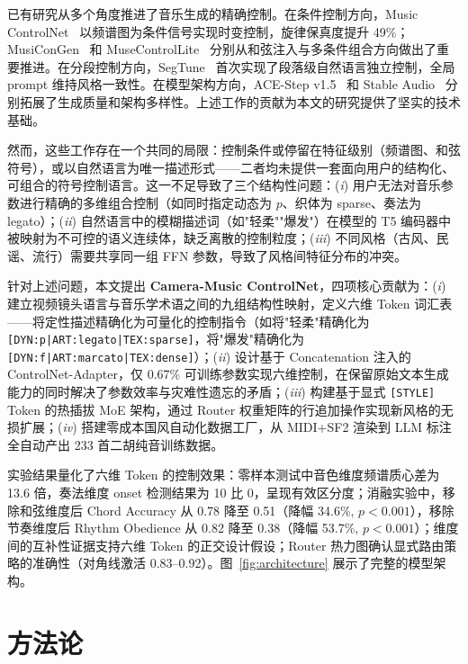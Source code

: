 \documentclass[11pt]{article}
\begin{document}
已有研究从多个角度推进了音乐生成的精确控制。在条件控制方向，Music ControlNet~\cite{musiccontrolnet} 以频谱图为条件信号实现时变控制，旋律保真度提升 49\%；MusiConGen~\cite{musecong} 和 MuseControlLite~\cite{muselite} 分别从和弦注入与多条件组合方向做出了重要推进。在分段控制方向，SegTune~\cite{segtune} 首次实现了段落级自然语言独立控制，全局 prompt 维持风格一致性。在模型架构方向，ACE-Step v1.5~\cite{acestep} 和 Stable Audio~\cite{stableaudio} 分别拓展了生成质量和架构多样性。上述工作的贡献为本文的研究提供了坚实的技术基础。

然而，这些工作存在一个共同的局限：控制条件或停留在特征级别（频谱图、和弦符号），或以自然语言为唯一描述形式——二者均未提供一套面向用户的结构化、可组合的符号控制语言。这一不足导致了三个结构性问题：(\textit{i}) 用户无法对音乐参数进行精确的多维组合控制（如同时指定动态为 $p$、织体为 sparse、奏法为 legato）；(\textit{ii}) 自然语言中的模糊描述词（如"轻柔""爆发"）在模型的 T5 编码器中被映射为不可控的语义连续体，缺乏离散的控制粒度；(\textit{iii}) 不同风格（古风、民谣、流行）需要共享同一组 FFN 参数，导致了风格间特征分布的冲突。

针对上述问题，本文提出 \textbf{Camera-Music ControlNet}，四项核心贡献为：(\textit{i}) 建立视频镜头语言与音乐学术语之间的九组结构性映射，定义六维 Token 词汇表——将定性描述精确化为可量化的控制指令（如将"轻柔"精确化为 \texttt{[DYN:p|ART:legato|TEX:sparse]}，将"爆发"精确化为 \texttt{[DYN:f|ART:marcato|TEX:dense]}）；(\textit{ii}) 设计基于 Concatenation 注入的 ControlNet-Adapter，仅 0.67\% 可训练参数实现六维控制，在保留原始文本生成能力的同时解决了参数效率与灾难性遗忘的矛盾；(\textit{iii}) 构建基于显式 \texttt{[STYLE]} Token 的热插拔 MoE 架构，通过 Router 权重矩阵的行追加操作实现新风格的无损扩展；(\textit{iv}) 搭建零成本国风自动化数据工厂，从 MIDI+SF2 渲染到 LLM 标注全自动产出 233 首二胡纯音训练数据。

实验结果量化了六维 Token 的控制效果：零样本测试中音色维度频谱质心差为 13.6 倍，奏法维度 onset 检测结果为 10 比 0，呈现有效区分度；消融实验中，移除和弦维度后 Chord Accuracy 从 0.78 降至 0.51（降幅 34.6\%, $p<0.001$），移除节奏维度后 Rhythm Obedience 从 0.82 降至 0.38（降幅 53.7\%, $p<0.001$）；维度间的互补性证据支持六维 Token 的正交设计假设；Router 热力图确认显式路由策略的准确性（对角线激活 0.83--0.92）。图~\ref{fig:architecture} 展示了完整的模型架构。


\section{方法论}
\end{document}

